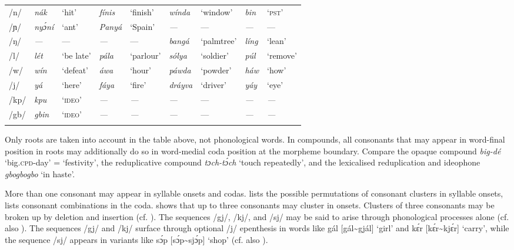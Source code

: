 \begin{sidewaystable}
\begin{tabularx}{\textwidth}{l lX lX lX lX}
/n/ & \itshape nák & ‘hit’ & \itshape fínis & ‘finish’ & \itshape wínda & ‘window’ & \itshape bin & ‘\textsc{pst’}\\
/ɲ/ & \itshape nyɔ́ní & ‘ant’ & \itshape Panyá & ‘Spain’ & \itshape {}--- & {}--- & \itshape {}--- & {}---\\
/ŋ/ & \itshape {}--- & {}--- & \itshape {}--- & {}--- & \itshape bangá & ‘palmtree’ & \itshape líng & ‘lean’\\
/l/ & \itshape lét & ‘be late’ & \itshape pála & ‘parlour’ & \itshape sólya & ‘soldier’ & \itshape púl & ‘remove’\\
/w/ & \itshape wín & ‘defeat’ & \itshape áwa & ‘hour’ & \itshape páwda & ‘powder’ & \itshape háw & ‘how’\\
/j/ & \itshape yá & ‘here’ & \itshape fáya & ‘fire’ & \itshape dráyva & ‘driver’ & \itshape yáy & ‘eye’\\
/kp/ & \itshape kpu & ‘\textsc{ideo}’ & \itshape {}--- & \textit{{}---} & \itshape {}--- & {}--- & \itshape {}--- & \textit{{}---}\\
/gb/ & \itshape gbin & ‘\textsc{ideo}’ & \itshape {}--- & \textit{{}---} & \itshape {}--- & {}--- & \itshape {}--- & \textit{{}---}\\
\lspbottomrule
\end{tabularx}
\end{sidewaystable}
Only roots are taken into account in the table above, not phonological words. In compounds, all consonants that may appear in word-final position in roots may additionally do so in word-medial coda position at the morpheme boundary. Compare the opaque compound \textit{big-dé} ‘big.\textsc{cpd}{}-day’ = ‘festivity’, the reduplicative compound \textit{tɔch-tɔ́ch} ‘touch repeatedly’, and the lexicalised reduplication and ideophone \textit{gbogbogbo} ‘in haste’.


More than one consonant may appear in syllable onsets and codas.  lists the possible permutations of consonant clusters in syllable onsets,  lists consonant combinations in the coda.  shows that up to three consonants may cluster in onsets. Clusters of three consonants may be broken up by deletion and insertion (cf. ). The sequences /gj/, /kj/, and /sj/ may be said to arise through phonological processes alone (cf. also ). The sequences /gj/ and /kj/ surface through optional /j/ epenthesis in words like gál [gál{\textasciitilde}gjál] ‘girl’ and kɛ́r [kɛ́r{\textasciitilde}kjɛ́r] ‘carry’, while the sequence /sj/ appears in variants like sɔ́p [sɔ́p{\textasciitilde}sjɔ́p] ‘shop’ (cf. also ).


